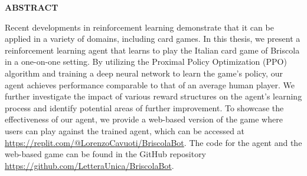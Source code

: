 \begin{center}
    \bf ABSTRACT
\end{center}
Recent developments in reinforcement learning demonstrate that it can be applied in a variety of domains, including card games. In this thesis, we present a reinforcement learning agent that learns to play the Italian card game of Briscola in a one-on-one setting. By utilizing the Proximal Policy Optimization (PPO) algorithm and training a deep neural network to learn the game's policy, our agent achieves performance comparable to that of an average human player. We further investigate the impact of various reward structures on the agent's learning process and identify potential areas of further improvement. To showcase the effectiveness of our agent, we provide a web-based version of the game where users can play against the trained agent, which can be accessed at \href{https://replit.com/@LorenzoCavuoti/BriscolaBot}{https://replit.com/@LorenzoCavuoti/BriscolaBot}. The code for the agent and the web-based game can be found in the GitHub repository \href{https://github.com/LetteraUnica/BriscolaBot}{https://github.com/LetteraUnica/BriscolaBot}.